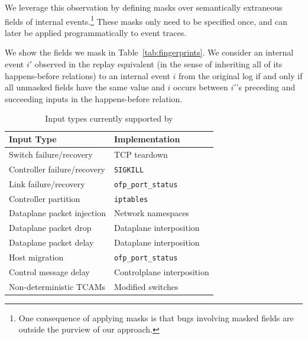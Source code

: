 We leverage this observation by defining
masks over semantically extraneous fields of
internal events.\footnote{One consequence
of applying masks is that bugs involving masked fields are outside the purview of
our approach.} These masks only need to be specified once, and can later be
applied programmatically to event traces.

We show the fields we mask in Table~\ref{tab:fingerprints}. We consider an
internal event $i'$ observed in the replay
equivalent (in the sense of inheriting all of its happens-before relations) to an internal
event $i$ from the original log if and only if all unmasked fields have the same value
and $i$ occurs between $i'$'s preceding and succeeding inputs in the
happens-before relation.

\begin{table}[tb]
\centering
\footnotesize
\begin{tabular}{|l|l|}
\hline
\textbf{Input Type} & \textbf{Implementation} \\
\hline
\hline
Switch failure/recovery & TCP teardown \\
\hline
Controller failure/recovery & \verb=SIGKILL= \\
\hline
Link failure/recovery & \verb=ofp_port_status= \\
\hline
Controller partition & \verb=iptables= \\
\hline
Dataplane packet injection & Network namespaces \\
\hline
Dataplane packet drop & Dataplane interposition \\
\hline
Dataplane packet delay & Dataplane interposition \\
\hline
Host migration & \verb=ofp_port_status= \\
\hline
Control message delay & Controlplane interposition \\
\hline
Non-deterministic TCAMs & Modified switches \\
\hline
\end{tabular}
\caption{Input types currently supported by \projectname}
\label{tab:inputs}
\vspace{-0.3cm}
\end{table}


